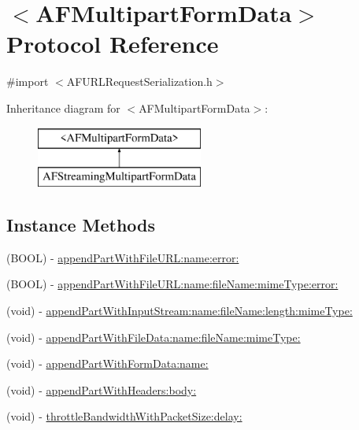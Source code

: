 \hypertarget{protocol_a_f_multipart_form_data-p}{}\section{$<$A\+F\+Multipart\+Form\+Data$>$ Protocol Reference}
\label{protocol_a_f_multipart_form_data-p}


{\ttfamily \#import $<$A\+F\+U\+R\+L\+Request\+Serialization.\+h$>$}

Inheritance diagram for $<$A\+F\+Multipart\+Form\+Data$>$\+:\begin{figure}[H]
\begin{center}
\leavevmode
\includegraphics[height=2.000000cm]{protocol_a_f_multipart_form_data-p}
\end{center}
\end{figure}
\subsection*{Instance Methods}
\begin{DoxyCompactItemize}
\item 
(B\+O\+O\+L) -\/ \hyperlink{protocol_a_f_multipart_form_data-p_a85eb0e9d04e80e720223434f6fd9230c}{append\+Part\+With\+File\+U\+R\+L\+:name\+:error\+:}
\item 
(B\+O\+O\+L) -\/ \hyperlink{protocol_a_f_multipart_form_data-p_a62e3f598b160a70c268a15eeaecad3d7}{append\+Part\+With\+File\+U\+R\+L\+:name\+:file\+Name\+:mime\+Type\+:error\+:}
\item 
(void) -\/ \hyperlink{protocol_a_f_multipart_form_data-p_a8ee0fa495a459b66777bd3025d5434f5}{append\+Part\+With\+Input\+Stream\+:name\+:file\+Name\+:length\+:mime\+Type\+:}
\item 
(void) -\/ \hyperlink{protocol_a_f_multipart_form_data-p_a4a65904d2372503bace2e45549a9d088}{append\+Part\+With\+File\+Data\+:name\+:file\+Name\+:mime\+Type\+:}
\item 
(void) -\/ \hyperlink{protocol_a_f_multipart_form_data-p_a0bc8ad1aa207469b218d2957245177b3}{append\+Part\+With\+Form\+Data\+:name\+:}
\item 
(void) -\/ \hyperlink{protocol_a_f_multipart_form_data-p_a09265f88e7b4ac0abab873a1105487a3}{append\+Part\+With\+Headers\+:body\+:}
\item 
(void) -\/ \hyperlink{protocol_a_f_multipart_form_data-p_ad8bf94a09638cf8147dda98472b1c42d}{throttle\+Bandwidth\+With\+Packet\+Size\+:delay\+:}
\end{DoxyCompactItemize}


